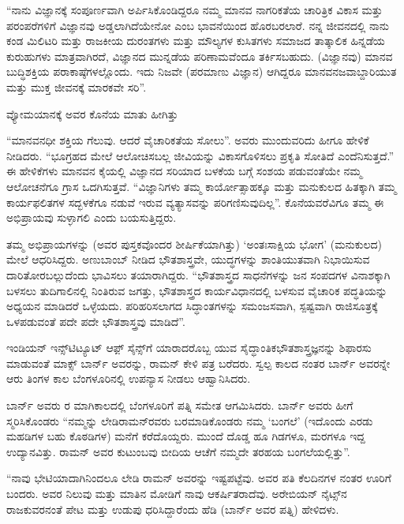 \enginline{--}“ನಾನು ವಿಜ್ಞಾನಕ್ಕೆ ಸಂಪೂರ್ಣವಾಗಿ ಅರ್ಪಿಸಿಕೊಂಡಿದ್ದರೂ ನಮ್ಮ ಮಾನವ ನಾಗರಿಕತೆಯ ಚಾರಿತ್ರಿಕ ವಿಕಾಸ ಮತ್ತು ಪರಂಪರೆಗಳಿಗೆ ವಿಜ್ಞಾನವು ಅಡ್ಡಲಾಗಿದೆಯೇನೋ ಎಂಬ ಭಾವನೆಯಿಂದ ಹೊರಬರಲಾರೆ. ನನ್ನ ಜೀವನದಲ್ಲಿ ನಾನು ಕಂಡ ಮಿಲಿಟರಿ ಮತ್ತು ರಾಜಕೀಯ ದುರಂತಗಳು ಮತ್ತು ಮೌಲ್ಯಗಳ ಕುಸಿತಗಳು ಸಮಾಜದ ತಾತ್ಕಾಲಿಕ ಹಿನ್ನಡೆಯ ಕುರುಹುಗಳು ಮಾತ್ರವಾಗಿರದೆ, ವಿಜ್ಞಾನದ ಮುನ್ನಡೆಯ ಪರಿಣಾಮವೆಂದೂ ತರ್ಕಿಸಬಹುದು. (ವಿಜ್ಞಾನವು) ಮಾನವ ಬುದ್ಧಿಶಕ್ತಿಯ ಪರಾಕಾಷ್ಠೆಗಳಲ್ಲೊಂದು. ಇದು ನಿಜವೇ (ಪರಮಾಣು ವಿಜ್ಞಾನ) ಆಗಿದ್ದರೂ ಮಾನವನ\break ಜವಾಬ್ದಾರಿಯುತ ಮತ್ತು ಮುಕ್ತ ಜೀವನಕ್ಕೆ ಮಾರಕವೇ ಸರಿ”.

ವ್ಯೋಮಯಾನಕ್ಕೆ ಅವರ ಕೊನೆಯ ಮಾತು ಹೀಗಿತ್ತು\enginline{--}

“ಮಾನವನಧೀ ಶಕ್ತಿಯ ಗೆಲುವು. ಆದರೆ ವೈಚಾರಿಕತೆಯ ಸೋಲು”. ಅವರು ಮುಂದುವರಿದು ಹೀಗೂ ಹೇಳಿಕೆ ನೀಡಿದರು.\enginline{--} “ಭೂಗ್ರಹದ ಮೇಲೆ ಆಲೋಚಿಸಬಲ್ಲ ಜೀವಿಯನ್ನು ವಿಕಾಸಗೊಳಿಸಲು ಪ್ರಕೃತಿ ಸೋತಿದೆ ಎಂದೆನಿಸುತ್ತದೆ.” ಈ ಹೇಳಿಕೆಗಳು ಮಾನವನ ಕೈಯಲ್ಲಿ ವಿಜ್ಞಾನದ ಸರಿಯಾದ ಬಳಕೆಯ ಬಗ್ಗೆ ಸಂಶಯ ಪಡುವಂತೆಯೇ ನಮ್ಮ ಆಲೋಚನೆಗೂ ಗ್ರಾಸ ಒದಗಿಸುತ್ತವೆ. “ವಿಜ್ಞಾನಿಗಳು ತಮ್ಮ ಕಾರ್ಯೋತ್ಸಾಹಕ್ಕೂ ಮತ್ತು ಮನುಕುಲದ ಹಿತಕ್ಕಾಗಿ ತಮ್ಮ ಕಾರ್ಯಫಲಿತಗಳ ಸದ್ಭಳಕೆಗೂ ನಡುವೆ ಇರುವ ವ್ಯತ್ಯಾಸವನ್ನು ಪರಿಗಣಿಸುವುದಿಲ್ಲ”. ಕೊನೆಯವರೆವಿಗೂ ತಮ್ಮ ಈ ಅಭಿಪ್ರಾಯವು ಸುಳ್ಳಾಗಲಿ ಎಂದು ಬಯಸುತ್ತಿದ್ದರು.

ತಮ್ಮ ಅಭಿಪ್ರಾಯಗಳನ್ನು \textit{} (ಅವರ ಪುಸ್ತಕವೊಂದರ ಶೀರ್ಷಿಕೆ\-ಯಾಗಿತ್ತು)\enginline{--} ‘ಅಂತಃಸಾಕ್ಷಿಯ ಭೋಗ’ (ಮನುಕುಲದ) ಮೇಲೆ ಆಧರಿಸಿದ್ದರು. ಅಣುಬಾಂಬ್ ನೀಡಿದ ಭೌತಶಾಸ್ತ್ರವೇ, ಯುದ್ಧಗಳನ್ನು ಶಾಂತಿಯುತವಾಗಿ ನಿಭಾಯಿಸುವ ದಾರಿತೋರಬಲ್ಲುದೆಂದು ಭಾವಿಸಲು ತಯಾರಾಗಿದ್ದರು. “ಭೌತಶಾಸ್ತ್ರದ ಸಾಧನೆಗಳನ್ನು ಜನ ಸಂಪದಗಳ ವಿನಾಶಕ್ಕಾಗಿ ಬಳಸಲು ತುದಿಗಾಲಿನಲ್ಲಿ ನಿಂತಿರುವ ಜಗತ್ತು, ಭೌತಶಾಸ್ತ್ರದ ಕಾರ್ಯವಿಧಾನದಲ್ಲಿ ಬಳಸುವ ವೈಚಾರಿಕ ಪದ್ಧತಿಯನ್ನು ಅಧ್ಯಯನ ಮಾಡಿದರೆ ಒಳ್ಳೆಯದು. ಪರಿಹರಿಸಲಾಗದ ಸಿದ್ಧಾಂತಗಳನ್ನು ಸಮಂಜಸ\-ವಾಗಿ, ಸ್ಪಷ್ಟವಾಗಿ ರಾಜಿಸೂತ್ರಕ್ಕೆ ಒಳಪಡುವಂತೆ ಪದೇ ಪದೇ ಭೌತಶಾಸ್ತ್ರವು ಮಾಡಿದೆ”.

ಇಂಡಿಯನ್ ಇನ್ಸ್‌ಟಿಟ್ಯೂಟ್ ಆಫ಼್ ಸೈನ್ಸ್‌ಗೆ ಯಾರಾದರೊಬ್ಬ ಯುವ ಸೈದ್ಧಾಂತಿಕ\break ಭೌತಶಾಸ್ತ್ರಜ್ಞನನ್ನು ಶಿಫಾರಸು ಮಾಡುವಂತೆ ಮಾಕ್ಸ್ ಬಾರ್ನ್ ಅವರನ್ನು, ರಾಮನ್ ಕೇಳಿ ಪತ್ರ ಬರೆದರು. ಸ್ವಲ್ಪ ಕಾಲದ ನಂತರ ಬಾರ್ನ್ ಅವರನ್ನೇ ಆರು ತಿಂಗಳ ಕಾಲ ಬೆಂಗಳೂರಿನಲ್ಲಿ ಉಪನ್ಯಾಸ ನೀಡಲು ಆಹ್ವಾನಿಸಿದರು.

ಬಾರ್ನ್ ಅವರು ರ ಮಾಗಿಕಾಲದಲ್ಲಿ ಬೆಂಗಳೂರಿಗೆ ಪತ್ನಿ ಸಮೇತ ಆಗಮಿಸಿದರು. ಬಾರ್ನ್ ಅವರು ಹೀಗೆ ಸ್ಮರಿಸಿಕೊಂಡರು\enginline{--} “ನಮ್ಮನ್ನು ಲೇಡಿರಾಮನ್‍ರವರು ಬರಮಾಡಿಕೊಂಡರು ನಮ್ಮ ‘ಬಂಗಲೆ’ \enginline{--}(ಇದೊಂದು ಎರಡು ಮಹಡಿಗಳ ಬಹು ಕೊಠಡಿಗಳ) ಮನೆಗೆ ಕರೆದೊಯ್ದರು. ಮುಂದೆ ದೊಡ್ಡ ಹೂ ಗಿಡಗಳೂ, ಮರಗಳೂ ಇದ್ದ ಉದ್ಯಾನವಿತ್ತು. ರಾಮನ್ ಅವರ ಕುಟುಂಬವು ಬೀದಿಯ ಆಚೆಗೆ ನಮ್ಮದೇ ತರಹಯ ಬಂಗಲೆಯಲ್ಲಿತ್ತು”.

“ನಾವು ಭೇಟಿಯಾದಾಗಿನಿಂದಲೂ ಲೇಡಿ ರಾಮನ್ ಅವರನ್ನು ಇಷ್ಟಪಟ್ಟೆವು. ಅವರ ಪತಿ ಕೆಲದಿನಗಳ ನಂತರ ಊರಿಗೆ ಬಂದರು. ಅವರ ನಿಲುವು ಮತ್ತು ಮಾತಿನ ಮೋಡಿಗೆ ನಾವು ಆಕರ್ಷಿತರಾದೆವು. ಅರೇಬಿಯನ್ ನೈಟ್ಸ್‌ನ ರಾಜಕುವರನಂತೆ ಪೇಟ ಮತ್ತು ಉಡುಪು ಧರಿಸಿದ್ದಾರೆಂದು ಹೆಡಿ (ಬಾರ್ನ್ ಅವರ ಪತ್ನಿ) ಹೇಳಿದಳು.

